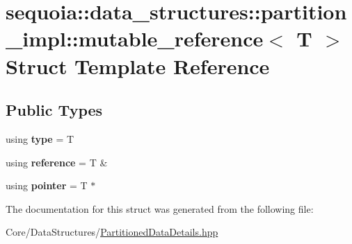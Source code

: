 \hypertarget{structsequoia_1_1data__structures_1_1partition__impl_1_1mutable__reference}{}\section{sequoia\+::data\+\_\+structures\+::partition\+\_\+impl\+::mutable\+\_\+reference$<$ T $>$ Struct Template Reference}
\label{structsequoia_1_1data__structures_1_1partition__impl_1_1mutable__reference}
\subsection*{Public Types}
\begin{DoxyCompactItemize}
\item 
\mbox{\label{structsequoia_1_1data__structures_1_1partition__impl_1_1mutable__reference_a5b49f610db2ec798f35f8cc7d68735a6}} 
using {\bfseries type} = T
\item 
\mbox{\label{structsequoia_1_1data__structures_1_1partition__impl_1_1mutable__reference_a011cb54683893f80a9291e9e9164d7a7}} 
using {\bfseries reference} = T \&
\item 
\mbox{\label{structsequoia_1_1data__structures_1_1partition__impl_1_1mutable__reference_a91efefabef4b9ceadb896185947ee7a0}} 
using {\bfseries pointer} = T $\ast$
\end{DoxyCompactItemize}


The documentation for this struct was generated from the following file\+:\begin{DoxyCompactItemize}
\item 
Core/\+Data\+Structures/\mbox{\hyperlink{_partitioned_data_details_8hpp}{Partitioned\+Data\+Details.\+hpp}}\end{DoxyCompactItemize}
